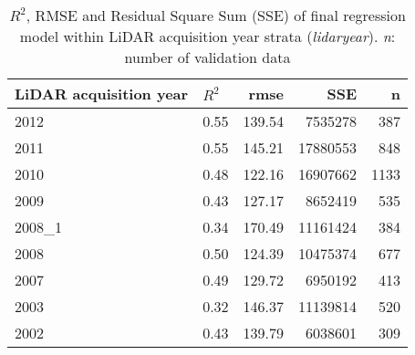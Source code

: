 \begin{table}[ht]
\centering
\caption{$R^2$, RMSE and Residual Square Sum (SSE) of final regression model within LiDAR acquisition year strata (\textit{lidaryear}). \textit{n}: number of validation data}
\label{tab:adj_r2_within}
\begin{tabular}{llrrr}
  \hline
 LiDAR acquisition year & $R^2$ & rmse & SSE & n \\ 
  \hline
2012   & 0.55 & 139.54 & 7535278 & 387 \\ 
 2011   & 0.55 & 145.21 & 17880553 & 848 \\ 
 2010   & 0.48 & 122.16 & 16907662 & 1133 \\ 
   2009   & 0.43 & 127.17 & 8652419 & 535 \\ 
 2008\_1 & 0.34 & 170.49 & 11161424 & 384 \\ 
   2008   & 0.50 & 124.39 & 10475374 & 677 \\ 
 2007   & 0.49 & 129.72 & 6950192 & 413 \\ 
  2003   & 0.32 & 146.37 & 11139814 & 520 \\ 
   2002   & 0.43 & 139.79 & 6038601 & 309 \\ 
   \hline
\hline
\end{tabular}
\end{table}

